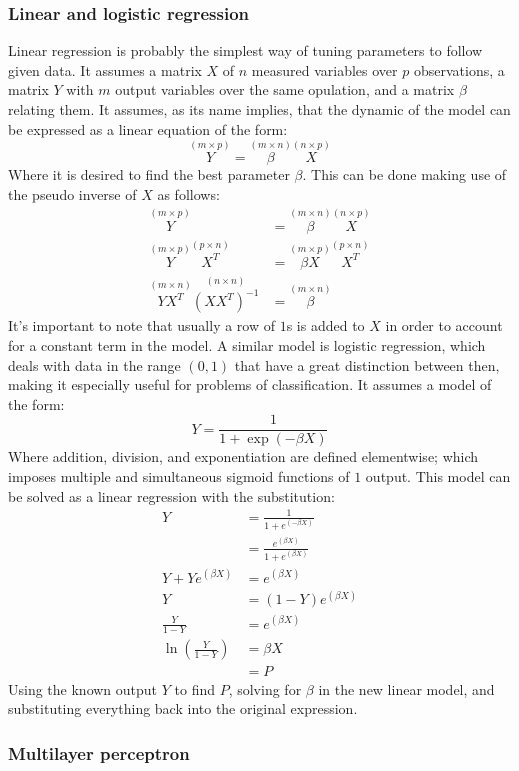 \subsubsection{Linear and logistic regression\label{sec:regression}}

Linear regression is probably the simplest way of tuning parameters to follow
given data. It assumes a matrix $X$ of $n$ measured variables over $p$
observations, a matrix $Y$ with $m$ output variables over the same opulation,
and a matrix $\beta$ relating them. It assumes, as its name implies, that the
dynamic of the model can be expressed as a linear equation of the form: 
%
\begin{equation}\label{eq:linear}
    \overset{(m\times p)}{Y}
    = \overset{(m\times n)}{\beta} \overset{(n\times p)}{X}
\end{equation}
%
Where it is desired to find the best parameter $\beta$. This can be done making
use of the pseudo inverse of $X$ as follows:
%
\begin{align*}
    \overset{(m\times p)}{Y}
        &= \overset{(m\times n)}{\beta} \overset{(n\times p)}{X}\\
    \overset{(m\times p)}{Y}\overset{(p\times n)}{X^T}
        &= \overset{(m\times p)}{\beta X} \overset{(p\times n)}{X^T}\nonumber\\
    \overset{(m\times n)}{Y X^T} \overset{(n\times n)}{\left(X X^T\right)^{-1}}
        &= \overset{(m\times n)}{\beta}
\end{align*}
%
It's important to note that usually a row of $1$s is added to $X$ in order to
account for a constant term in the model. A similar model is logistic
regression, which deals with data in the range $(0, 1)$ that have a great
distinction between then, making it especially useful for problems of
classification. It assumes a model of the form:
%
\begin{equation}
    Y = \frac{1}{1+\exp{(-\beta X)}}
\end{equation}
%
Where addition, division, and exponentiation are defined elementwise; which
imposes multiple and simultaneous sigmoid functions of $1$ output. 
This model can be solved as a linear regression with the substitution:
%
\begin{align*}
    Y &= \frac{1}{1+e^{(-\beta X)}}\nonumber\\
        &= \frac{e^{(\beta X)}}{1+e^{(\beta X)}}\\
    Y+Ye^{(\beta X)}
        &= e^{(\beta X)}\\
    Y &= (1-Y) e^{(\beta X)}\\
    \frac{Y}{1-Y} &= e^{(\beta X)}\\
    \ln{\left(\frac{Y}{1-Y}\right)} &= \beta X\\
        &= P
\end{align*}
%
Using the known output $Y$ to find $P$, solving for $\beta$ in the new linear
model, and substituting everything back into the original expression.

\subsubsection{Multilayer perceptron\label{sec:nn}}
